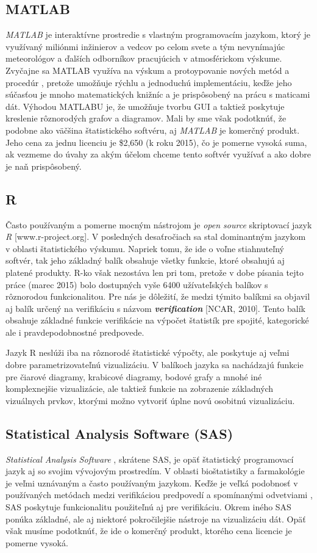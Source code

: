 \subsection{MATLAB}
\textit{MATLAB} je interaktívne prostredie s vlastným programovacím jazykom, ktorý je využívaný miliónmi inžinierov a vedcov po celom svete \cite{Matlab} a tým nevynímajúc meteorológov a ďalších odborníkov pracujúcich v atmosférickom výskume. 
Zvyčajne sa MATLAB využíva na výskum a protoypovanie nových metód a procedúr \cite{VerifSoft}, pretože umožňuje rýchlu a jednoduchú implementáciu, keďže jeho súčasťou je mnoho matematických knižníc a je prispôsobený na prácu s maticami dát.
Výhodou MATLABU je, že umožňuje tvorbu GUI a taktiež poskytuje kreslenie rôznorodých grafov a diagramov.
Mali by sme však podotknúť, že podobne ako väčšina štatistického softvéru, aj \textit{MATLAB} je komerčný produkt. Jeho cena za jednu licenciu je \$2,650 (k roku 2015), čo je pomerne vysoká suma, ak vezmeme do úvahy za akým účelom chceme tento softvér využívať a ako dobre je naň prispôsobený.

\subsection{R}
Často používaným a pomerne mocným nástrojom je \textit{open source} skriptovací jazyk \textit{R} [www.r-project.org]. V posledných desaťročiach sa stal dominantným jazykom v oblasti štatistického výskumu. Napriek tomu, že ide o voľne stiahnuteľný softvér, tak jeho základný balík obsahuje všetky funkcie, ktoré obsahujú aj platené produkty. R-ko však nezostáva len pri tom, pretože v dobe písania tejto práce (marec 2015) bolo dostupných vyše 6400 užívateľských balíkov s rôznorodou funkcionalitou. Pre nás je dôležití, že medzi týmito balíkmi sa objavil aj balík určený na verifikáciu s názvom \textit{\textbf{verification}} [NCAR, 2010]. Tento balík obsahuje základné funkcie verifikácie na výpočet štatistík pre spojité, kategorické ale i pravdepodobnostné predpovede. 

Jazyk R neslúži iba na rôznorodé štatistické výpočty, ale poskytuje aj veľmi dobre parametrizovateľnú vizualizáciu. V balíkoch jazyka sa nachádzajú funkcie pre čiarové diagramy, krabicové diagramy, bodové grafy a mnohé iné komplexnejšie vizualizácie, ale taktiež funkcie na zobrazenie základných vizuálnych prvkov, ktorými možno vytvoriť úplne novú osobitnú vizualizáciu.

\subsection[SAS]{Statistical Analysis Software (SAS)}
\textit{Statistical Analysis Software} \cite{SAS}, skrátene SAS, je opäť štatistický programovací jazyk aj so svojim vývojovým prostredím. V oblasti bioštatistiky a farmakológie je veľmi uznávaným a často používaným jazykom. Keďže je veľká podobnosť v používaných metódach medzi verifikáciou predpovedí a spomínanými odvetviami \cite{VerifSoft}, SAS poskytuje funkcionalitu použiteľnú aj pre verifikáciu. Okrem iného SAS ponúka základné, ale aj niektoré pokročilejšie nástroje na vizualizáciu dát. Opäť však musíme podotknúť, že ide o komerčný produkt, ktorého cena licencie je pomerne vysoká.

